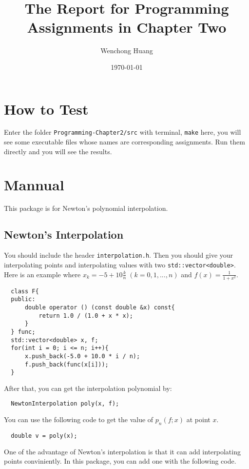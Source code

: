 \documentclass[11pt,en]{elegantpaper}
\title{The Report for Programming Assignments in Chapter Two}
\author{Wenchong Huang}
\date{\today}
\begin{document}
\maketitle


\section{How to Test}

Enter the folder \verb|Programming-Chapter2/src| with terminal, \verb |make| here, you will see some executable files whose names are corresponding assignments. Run them directly and you will see the results.

\section{Mannual}

This package is for Newton's polynomial interpolation.

\subsection{Newton's Interpolation}

You should include the header \verb|interpolation.h|. Then you should give your interpolating points and interpolating values with two \verb|std::vector<double>|. Here is an example where $x_k=-5+10\frac{k}{n}\;(k=0,1,...,n)$ and $f(x)=\frac{1}{1+x^2}$.

\begin{lstlisting}
  class F{
  public:
      double operator () (const double &x) const{
          return 1.0 / (1.0 + x * x);
      }
  } func;
  std::vector<double> x, f;
  for(int i = 0; i <= n; i++){
      x.push_back(-5.0 + 10.0 * i / n);
      f.push_back(func(x[i]));
  }
\end{lstlisting}

After that, you can get the interpolation polynomial by:

\begin{lstlisting}
  NewtonInterpolation poly(x, f);
\end{lstlisting}

You can use the following code to get the value of $p_n(f;x)$ at point $x$.

\begin{lstlisting}
  double v = poly(x);
\end{lstlisting}

One of the advantage of Newton's interpolation is that it can add interpolating points conviniently. In this package, you can add one with the following code.
\end{document}

